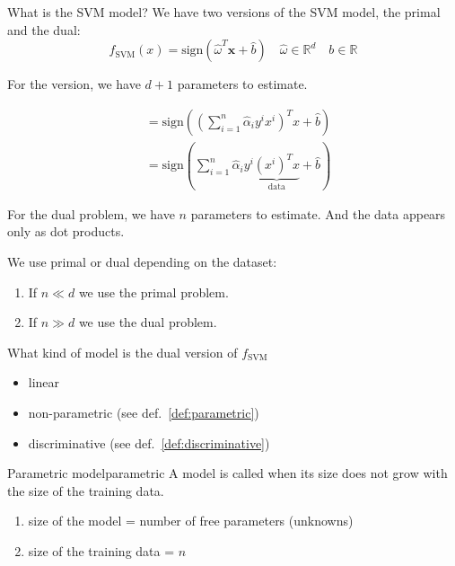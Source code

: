 \begin{question}{What is the SVM model?}{}
	We have two versions of the SVM model, the primal and the dual:
	\begin{equation*}
		f_\text{SVM}(x) = \text{sign} \left( \hat{\omega}^T \boldsymbol{x} + \hat{b} \right)
		\quad \hat\omega \in \mathds{R}^d
		\quad b \in \mathds{R}
		\tag{PRIMAL}
	\end{equation*}

  For the  version, we have $d+1$ parameters to estimate.

	\begin{align*}
		 & = \text{sign} \left( \left(\sum_{i=1}^n \hat\alpha_i y^i x^i \right)^T x + \hat{b} \right) \\
		 & = \text{sign} \left( \sum_{i=1}^n \hat\alpha_i y^i
		\underbrace{(x^i)^T x}_{\text{data}} + \hat{b} \right)
		\tag{DUAL}
	\end{align*}

	For the dual problem, we have $n$ parameters to estimate.
	And the data appears only as dot products.

	\vspace{0.5em}
	We use primal or dual depending on the dataset:
	\begin{enumerate}
		\item If $n \ll d$ we use the primal problem.
		\item If $n \gg d$ we use the dual problem.
	\end{enumerate}
\end{question}

\begin{question}{What kind of model is the dual version of $f_\text{SVM}$}{}
	\begin{itemize}
		\item linear
		\item non-parametric (see def.~\ref{def:parametric})
		\item discriminative (see def.~\ref{def:discriminative})
	\end{itemize}
\end{question}

\begin{definition}{Parametric model}{parametric}
	A model is called  when its size does not
	grow with the size of the training data.

	\begin{enumerate}
		\item size of the model = number of free parameters (unknowns)
		\item size of the training data = $n$
	\end{enumerate}
\end{definition}

